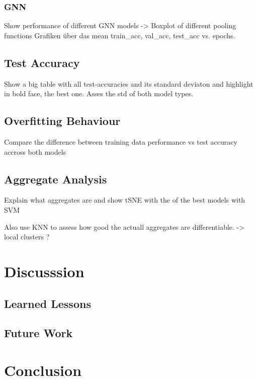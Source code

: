 \subsubsection{GNN}
Show performance of different GNN models -> Boxplot of different pooling functions
Grafiken über das mean train\_acc, val\_acc, test\_acc vs. epochs.

\subsection{Test Accuracy}
Show a big table with all test-accuracies and its standard deviaton and highlight in bold face, the best one.
Asses the std of both model types.

\subsection{Overfitting Behaviour}
Compare the difference between training data performance vs test accuracy accross both models

\subsection{Aggregate Analysis}
Explain what aggregates are and show tSNE with the of the best models with SVM

Also use KNN to assess how good the actuall aggregates are differentiable. -> local clusters ?

\section{Discusssion}
\subsection{Learned Lessons}
\subsection{Future Work}

\section{Conclusion}



